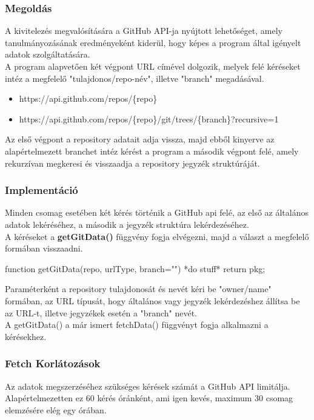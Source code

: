 \subsubsection{Megoldás}
A kivitelezés megvalósítására a GitHub API-ja nyújtott lehetőséget, amely tanulmányozásának eredményeként kiderül, hogy képes a program által igényelt adatok szolgáltatására.\\

A program alapvetően két végpont URL címével dolgozik, melyek felé kéréseket intéz a megfelelő "tulajdonos/repo-név", illetve "branch" megadásával.
\begin{itemize}
	\item https://api.github.com/repos/\{repo\}
	\item https://api.github.com/repos/\{repo\}/git/trees/\{branch\}?recursive=1
\end{itemize}

Az első végpont a repository adatait adja vissza, majd ebből kinyerve az alapértelmezett branchet intéz kérést a program a második végpont felé, amely rekurzívan megkeresi és visszaadja a repository jegyzék struktúráját.

\subsubsection{Implementáció}
Minden csomag esetében két kérés történik a GitHub api felé, az első az általános adatok lekéréséhez, a második a jegyzék struktúra lekérdezéséhez.\\

A kéréseket a \textbf{getGitData()} függvény fogja elvégezni, majd a választ a megfelelő formában visszaadni.

\begin{js}
	function getGitData(repo, urlType, branch=""){  
		*do stuff*
		return pkg;
	}
\end{js}
Paraméterként a repository tulajdonosát és nevét kéri be "owner/name" formában, az URL típusát, hogy általános vagy jegyzék lekérdezéshez állítsa be az URL-t, illetve jegyzékek esetén a "branch" nevét.\\

A getGitData() a már ismert fetchData() függvényt fogja alkalmazni a kérésekhez.

\subsubsection{Fetch Korlátozások}
Az adatok megszerzéséhez szükséges kérések számát a GitHub API limitálja. Alapértelmezetten ez 60 kérés óránként, ami igen kevés, maximum 30 csomag elemzésére elég egy órában.

